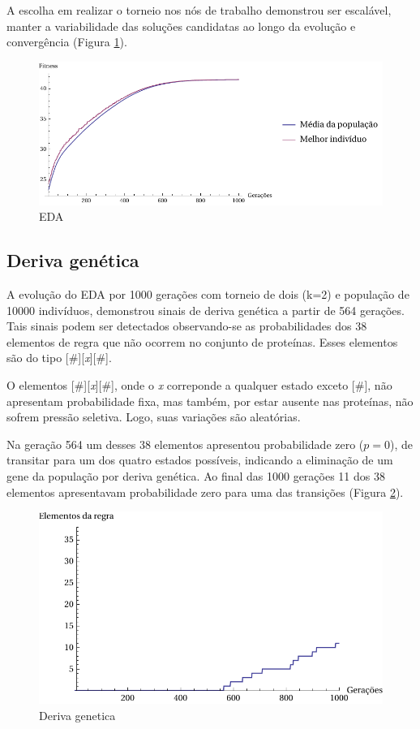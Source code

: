 A escolha em realizar o torneio nos nós de trabalho demonstrou ser escalável, manter a variabilidade das soluções candidatas ao longo da evolução e convergência (Figura \ref{fig:evo_eda}).

\begin{figure}
  \centering
  \includegraphics[width=1\textwidth]{figures/evo_Eda.pdf}
  \caption{EDA}
        \label{fig:evo_eda}
\end{figure}

\subsection{Deriva genética}

A evolução do EDA por 1000 gerações com torneio de dois (k=2) e população de 10000 indivíduos, demonstrou sinais de deriva genética a partir de 564 gerações. Tais sinais podem ser detectados observando-se as probabilidades dos 38 elementos de regra que não ocorrem no conjunto de proteínas. Esses elementos são do tipo [\#][\textit{x}][\#].

O elementos [\#][\textit{x}][\#], onde o \textit{x} correponde a qualquer estado exceto [\#], não apresentam probabilidade fixa, mas também, por estar ausente nas proteínas, não sofrem pressão seletiva. Logo, suas variações são aleatórias.

Na geração 564 um desses 38 elementos apresentou probabilidade zero ($p=0$), de transitar para um dos quatro estados possíveis, indicando a eliminação de um gene da população por deriva genética. Ao final das 1000 gerações 11 dos 38 elementos apresentavam probabilidade zero para uma das transições (Figura \ref{fig:deriva_genetica}).

\begin{figure}
  \centering
  \includegraphics[width=1\textwidth]{figures/deriva_genetica.pdf}
  \caption{Deriva genetica}
        \label{fig:deriva_genetica}
\end{figure}

